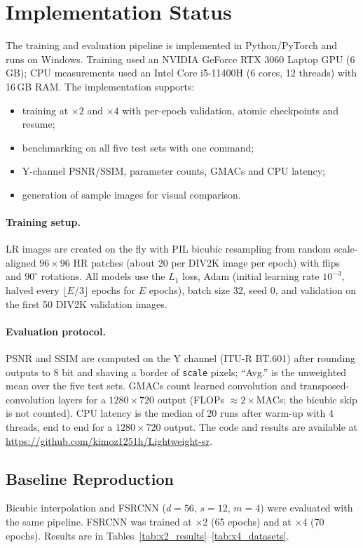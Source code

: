 \documentclass[11pt]{article}
\begin{document}
\section{Implementation Status}
\label{sec:status}
The training and evaluation pipeline is implemented in Python/PyTorch and runs on Windows. Training used an NVIDIA GeForce RTX 3060 Laptop GPU (6\,GB); CPU measurements used an Intel Core i5-11400H (6 cores, 12 threads) with 16\,GB RAM. The implementation supports:
\begin{itemize}
    \item training at $\times2$ and $\times4$ with per-epoch validation, atomic checkpoints and resume;
    \item benchmarking on all five test sets with one command;
    \item Y-channel PSNR/SSIM, parameter counts, GMACs and CPU latency;
    \item generation of sample images for visual comparison.
\end{itemize}

\paragraph{Training setup.} LR images are created on the fly with PIL bicubic resampling from random scale-aligned $96\times96$ HR patches (about 20 per DIV2K image per epoch) with flips and $90^\circ$ rotations. All models use the $L_1$ loss, Adam (initial learning rate $10^{-3}$, halved every $\lfloor E/3\rfloor$ epochs for $E$ epochs), batch size 32, seed 0, and validation on the first 50 DIV2K validation images.

\paragraph{Evaluation protocol.} PSNR and SSIM are computed on the Y channel (ITU-R BT.601) after rounding outputs to 8 bit and shaving a border of \texttt{scale} pixels; ``Avg.'' is the unweighted mean over the five test sets. GMACs count learned convolution and transposed-convolution layers for a $1280\times720$ output (FLOPs $\approx2\times$MACs; the bicubic skip is not counted). CPU latency is the median of 20 runs after warm-up with 4 threads, end to end for a $1280\times720$ output.
The code and results are available at \url{https://github.com/kimoz1251h/Lightweight-sr}.

\subsection{Baseline Reproduction}
Bicubic interpolation and FSRCNN ($d=56$, $s=12$, $m=4$) were evaluated with the same pipeline. FSRCNN was trained at $\times2$ (65 epochs) and at $\times4$ (70 epochs). Results are in Tables~\ref{tab:x2_results}--\ref{tab:x4_datasets}.
\end{document}
